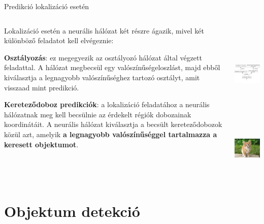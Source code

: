 \documentclass[english, aspectratio=169]{beamer}
\begin{document}
	\begin{frame}{Predikció lokalizáció esetén}
		\begin{columns}
			\begin{column}{.6\textwidth}
				Lokalizáció esetén a neurális hálózat két részre ágazik, mivel két különböző feladatot kell elvégeznie:\par\smallskip
				\textbf{Osztályozás}: ez megegyezik az osztályozó hálózat által végzett feladattal. A hálózat megbecsül egy valószínűségeloszlást, majd ebből kiválasztja a legnagyobb valószínűséghez tartozó osztályt, amit visszaad mint predikció.\par\smallskip
				\textbf{Kereteződoboz predikciók}: a lokalizáció feladatához a neurális hálózatnak meg kell becsülnie az érdekelt régiók dobozainak koordinátáit. A neurális hálózat kiválasztja a becsült kereteződobozok közül azt, amelyik \textbf{a legnagyobb valószínűséggel tartalmazza a keresett objektumot}. 
			\end{column}
			\begin{column}{.4\textwidth}
				\begin{center}
					\includegraphics[height=5cm, width=5.5cm, keepaspectratio]{graphs/od_2.png}\\
					\vspace{-0.7cm}
					\includegraphics[height=2.5cm, width=2.5cm, keepaspectratio]{images/od_1.png}
				\end{center}
			\end{column}
		\end{columns}
	\end{frame}
	
	\section{Objektum detekció}
	
\end{document}
